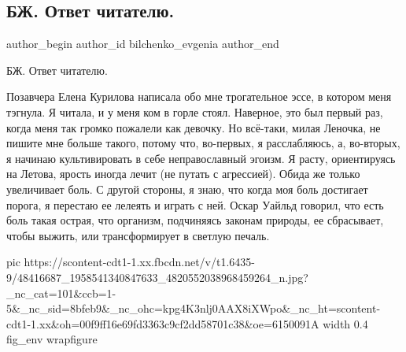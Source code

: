  
 
 
 
 
 
\subsection{БЖ. Ответ читателю.}
\label{sec:27_12_2018.fb.bilchenko_evgenia.1.otvet_chitatelju}
 
\ifcmt
 author_begin
   author_id bilchenko_evgenia
 author_end
\fi

БЖ. Ответ читателю.

Позавчера Елена Курилова написала обо мне трогательное эссе, в котором меня
тэгнула. Я читала, и у меня ком в горле стоял. Наверное, это был первый раз,
когда меня так громко пожалели как девочку. Но всё-таки, милая Леночка, не
пишите мне больше такого, потому что, во-первых, я расслабляюсь, а, во-вторых,
я начинаю культивировать в себе неправославный эгоизм. Я расту, ориентируясь на
Летова, ярость иногда лечит (не путать с агрессией). Обида же только
увеличивает боль. С другой стороны, я знаю, что когда моя боль достигает
порога, я перестаю ее лелеять и играть с ней. Оскар Уайльд говорил, что есть
боль такая острая, что организм, подчиняясь законам природы, ее сбрасывает,
чтобы выжить, или трансформирует в светлую печаль.

\ifcmt
  pic https://scontent-cdt1-1.xx.fbcdn.net/v/t1.6435-9/48416687_1958541340847633_4820552038968459264_n.jpg?_nc_cat=101&ccb=1-5&_nc_sid=8bfeb9&_nc_ohc=kpg4K3nlj0AAX8iXWpo&_nc_ht=scontent-cdt1-1.xx&oh=00f9ff16e69fd3363c9cf2dd58701c38&oe=6150091A
  width 0.4
	fig_env wrapfigure
\fi

